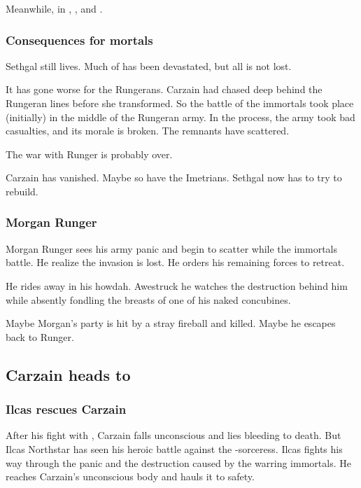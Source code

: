 Meanwhile, in \Malcur, , and .





\subsubsection{Consequences for mortals}
Sethgal still lives. 
Much of \Forclin has been devastated, but all is not lost. 

It has gone worse for the Rungerans. 
Carzain had chased \Takestsha deep behind the Rungeran lines before she transformed.
So the battle of the immortals took place (initially) in the middle of the Rungeran army. 
In the process, the army took bad casualties, and its morale is broken. 
The remnants have scattered. 

The war with Runger is probably over. 

Carzain has vanished.
Maybe so have the Imetrians. 
Sethgal now has to try to rebuild. 





\subsubsection{Morgan Runger}
Morgan Runger sees his army panic and begin to scatter while the immortals battle. 
He realize the invasion is lost. 
He orders his remaining forces to retreat. 

He rides away in his howdah.
Awestruck he watches the destruction behind him while absently fondling the breasts of one of his naked concubines. 

Maybe Morgan's party is hit by a stray fireball and killed. 
Maybe he escapes back to Runger. 










\subsection{Carzain heads to \Redce}





\subsubsection{Ilcas rescues Carzain}
After his fight with \Takestsha, Carzain falls unconscious and lies bleeding to death. 
But Ilcas Northstar has seen his heroic battle against the \dragon-sorceress. 
Ilcas fights his way through the panic and the destruction caused by the warring immortals. 
He reaches Carzain's unconscious body and hauls it to safety. 

